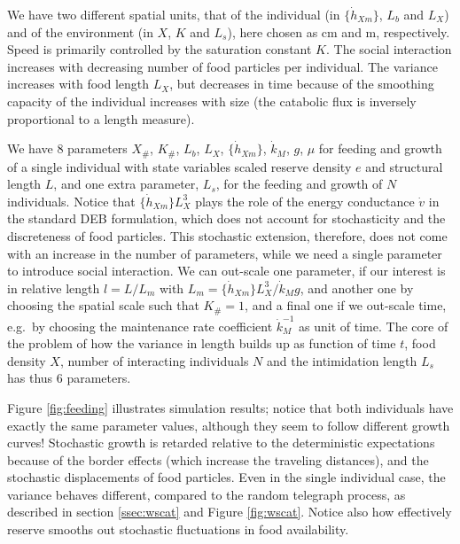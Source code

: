 We have two different spatial units, that of the individual (in $\{\dot{h}_{Xm}\}$, $L_b$ and $L_X$) and of the environment (in $X$, $K$ and $L_s$), here chosen as cm and m, respectively. 
Speed is primarily controlled by the saturation constant $K$. 
The social interaction increases with decreasing number of food particles per individual. 
The variance increases with food length $L_X$, but decreases in time because of the smoothing capacity of the individual increases with size (the catabolic flux is inversely proportional to a length measure).
  
We have 8 parameters $X_\#$, $K_\#$, $L_b$, $L_X$, $\{\dot{h}_{Xm}\}$, $\dot{k}_M$, $g$, $\mu$ for feeding and growth of a single individual with state variables scaled reserve density $e$ and structural length $L$, and one extra parameter, $L_s$, for the feeding and growth of $N$ individuals. 
Notice that $\{\dot{h}_{Xm}\} L_X^3$ plays the role of the energy conductance $\dot{v}$ in the standard DEB formulation,
which does not account for stochasticity and the discreteness of food particles.  
This stochastic extension, therefore, does not come with an increase in the number of parameters, while we need a single
parameter to introduce social interaction. 
We can out-scale one parameter, if our interest is in relative length $l = L/ L_m$ with $L_m = \{\dot{h}_{Xm}\} L_X^3/ \dot{k}_M g$, and another one by choosing the spatial scale such that $K_\# = 1$, and a final one if we out-scale time, e.g.\ by choosing the maintenance rate coefficient $\dot{k}_M^{-1}$ as unit of time. 
The core of the problem of how the variance in length builds up as function of time $t$, food density $X$, number of interacting individuals $N$ and the intimidation length $L_s$ has thus 6 parameters.
  
Figure \ref{fig:feeding} illustrates simulation results; notice that both individuals have exactly the same parameter values, although they seem to follow different growth curves! 
Stochastic growth is retarded relative to the deterministic expectations because of the border effects (which increase the traveling distances), and the stochastic displacements of food particles. 
Even in the single individual case, the variance behaves different, compared to the random telegraph process,
as described in section \ref{ssec:wscat} and Figure \ref{fig:wscat}. 
Notice also how effectively reserve smooths out stochastic fluctuations in food availability.

